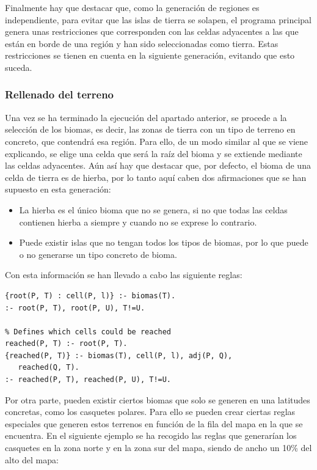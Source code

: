 Finalmente hay que destacar que, como la generación de regiones es independiente, para evitar que las islas de tierra se solapen, el programa principal genera unas restricciones que corresponden con las celdas adyacentes a las que están en borde de una región y han sido seleccionadas como tierra. Estas restricciones se tienen en cuenta en la siguiente generación, evitando que esto suceda.

\subsubsection{Rellenado del terreno}

Una vez se ha terminado la ejecución del apartado anterior, se procede a la selección de los biomas, es decir, las zonas de tierra con un tipo de terreno en concreto, que contendrá esa región. Para ello, de un modo similar al que se viene explicando, se elige una celda que será la raíz del bioma y se extiende mediante las celdas adyacentes. Aún así hay que destacar que, por defecto, el bioma de una celda de tierra es de hierba, por lo tanto aquí caben dos afirmaciones que se han supuesto en esta generación:

\begin{itemize}
	\item La hierba es el único bioma que no se genera, si no que todas las celdas contienen hierba a siempre y cuando no se exprese lo contrario.
	\item Puede existir islas que no tengan todos los tipos de biomas, por lo que puede o no generarse un tipo concreto de bioma.
\end{itemize}

Con esta información se han llevado a cabo las siguiente reglas: \\

\begin{lstlisting}[label=lst:biomas]
% The root of a bioma
{root(P, T) : cell(P, l)} :- biomas(T).
:- root(P, T), root(P, U), T!=U.

% Defines which cells could be reached
reached(P, T) :- root(P, T).
{reached(P, T)} :- biomas(T), cell(P, l), adj(P, Q),
   reached(Q, T).
:- reached(P, T), reached(P, U), T!=U.
\end{lstlisting}

\hspace{1em}

Por otra parte, pueden existir ciertos biomas que solo se generen en una latitudes concretas, como los casquetes polares. Para ello se pueden crear ciertas reglas especiales que generen estos terrenos en función de la fila del mapa en la que se encuentra. En el siguiente ejemplo se ha recogido las reglas que generarían los casquetes en la zona norte y en la zona sur del mapa, siendo de ancho un 10\% del alto del mapa: \\

